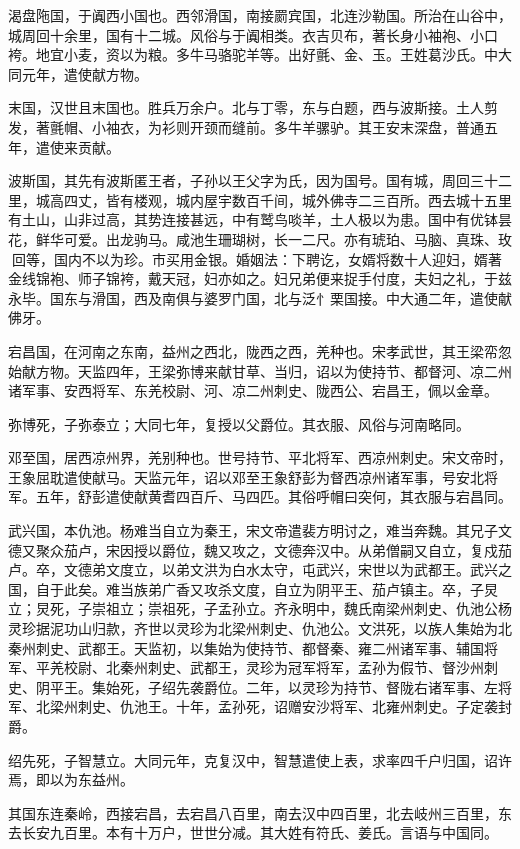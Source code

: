 \documentclass[12pt,UTF8]{ctexbook}
\begin{document}
渴盘陁国，于阗西小国也。西邻滑国，南接罽宾国，北连沙勒国。所治在山谷中，城周回十余里，国有十二城。风俗与于阗相类。衣吉贝布，著长身小袖袍、小口袴。地宜小麦，资以为粮。多牛马骆驼羊等。出好氈、金、玉。王姓葛沙氏。中大同元年，遣使献方物。

末国，汉世且末国也。胜兵万余户。北与丁零，东与白题，西与波斯接。土人剪发，著氈帽、小袖衣，为衫则开颈而缝前。多牛羊骡驴。其王安末深盘，普通五年，遣使来贡献。

波斯国，其先有波斯匿王者，子孙以王父字为氏，因为国号。国有城，周回三十二里，城高四丈，皆有楼观，城内屋宇数百千间，城外佛寺二三百所。西去城十五里有土山，山非过高，其势连接甚远，中有鹫鸟啖羊，土人极以为患。国中有优钵昙花，鲜华可爱。出龙驹马。咸池生珊瑚树，长一二尺。亦有琥珀、马脑、真珠、玫回等，国内不以为珍。市买用金银。婚姻法：下聘讫，女婿将数十人迎妇，婿著金线锦袍、师子锦袴，戴天冠，妇亦如之。妇兄弟便来捉手付度，夫妇之礼，于兹永毕。国东与滑国，西及南俱与婆罗门国，北与泛忄栗国接。中大通二年，遣使献佛牙。

宕昌国，在河南之东南，益州之西北，陇西之西，羌种也。宋孝武世，其王梁帟忽始献方物。天监四年，王梁弥博来献甘草、当归，诏以为使持节、都督河、凉二州诸军事、安西将军、东羌校尉、河、凉二州刺史、陇西公、宕昌王，佩以金章。

弥博死，子弥泰立；大同七年，复授以父爵位。其衣服、风俗与河南略同。

邓至国，居西凉州界，羌别种也。世号持节、平北将军、西凉州刺史。宋文帝时，王象屈耽遣使献马。天监元年，诏以邓至王象舒彭为督西凉州诸军事，号安北将军。五年，舒彭遣使献黄耆四百斤、马四匹。其俗呼帽曰突何，其衣服与宕昌同。

武兴国，本仇池。杨难当自立为秦王，宋文帝遣裴方明讨之，难当奔魏。其兄子文德又聚众茄卢，宋因授以爵位，魏又攻之，文德奔汉中。从弟僧嗣又自立，复戍茄卢。卒，文德弟文度立，以弟文洪为白水太守，屯武兴，宋世以为武都王。武兴之国，自于此矣。难当族弟广香又攻杀文度，自立为阴平王、茄卢镇主。卒，子炅立；炅死，子崇祖立；崇祖死，子孟孙立。齐永明中，魏氏南梁州刺史、仇池公杨灵珍据泥功山归款，齐世以灵珍为北梁州刺史、仇池公。文洪死，以族人集始为北秦州刺史、武都王。天监初，以集始为使持节、都督秦、雍二州诸军事、辅国将军、平羌校尉、北秦州刺史、武都王，灵珍为冠军将军，孟孙为假节、督沙州刺史、阴平王。集始死，子绍先袭爵位。二年，以灵珍为持节、督陇右诸军事、左将军、北梁州刺史、仇池王。十年，孟孙死，诏赠安沙将军、北雍州刺史。子定袭封爵。

绍先死，子智慧立。大同元年，克复汉中，智慧遣使上表，求率四千户归国，诏许焉，即以为东益州。

其国东连秦岭，西接宕昌，去宕昌八百里，南去汉中四百里，北去岐州三百里，东去长安九百里。本有十万户，世世分减。其大姓有符氏、姜氏。言语与中国同。
\end{document}
